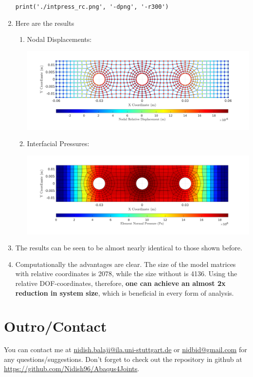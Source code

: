 \documentclass[11pt]{article}
\begin{document}
\begin{enumerate}
\begin{verbatim}
print('./intpress_rc.png', '-dpng', '-r300')
\end{verbatim}
\item Here are the results
\begin{enumerate}
\item Nodal Displacements:
\begin{center}
\includegraphics[width=\textwidth]{./figs/intdisps_rc.png}
\end{center}
\item Interfacial Pressures:
\begin{center}
\includegraphics[width=\textwidth]{./figs/intpress_rc.png}
\end{center}
\end{enumerate}
\item The results can be seen to be almost nearly identical to those shown before.
\item Computationally the advantages are clear.
The size of the model matrices with relative coordinates is 2078, while the size without is 4136.
Using the relative DOF-coordinates, therefore, \textbf{one can achieve an almost 2x reduction in system size}, which is beneficial in every form of analysis.
\end{enumerate}
\pagebreak
\section{Outro/Contact}
\label{sec:outro}
You can contact me at \href{mailto:nidish.balaji@ila.uni-stuttgart.de}{nidish.balaji@ila.uni-stuttgart.de} or \href{mailto:nidbid@gmail.com}{nidbid@gmail.com} for any questions/suggestions.
Don't forget to check out the repository in github at \href{https://github.com/Nidish96/Abaqus4Joints}{https://github.com/Nidish96/Abaqus4Joints}.
\end{document}
